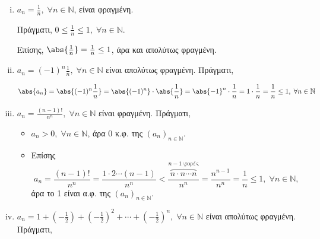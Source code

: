 \documentclass[main.tex]{subfiles}
\begin{document}
\begin{examples}
\item {}  
    \begin{enumerate}[i)]
        \item $ a_{n}= \frac{1}{n}, \; \forall n \in \mathbb{N} $, είναι 
            φραγμένη.

            Πράγματι, $ 0 \leq \frac{1}{n} \leq 1, \; \forall n \in 
            \mathbb{N} $. 

            Επίσης, $ \abs{\frac{1}{n}} = \frac{1}{n} \leq 1 $, άρα και 
            απολύτως φραγμένη.
        \item $ a_{n}=(-1)^{n} \frac{1}{n}, \; \forall n \in \mathbb{N} $ 
            είναι απολύτως φραγμένη. Πράγματι,

            \[
                \abs{a_{n}} = \abs{(-1)^{n} \frac{1}{n}} = \abs{(-1)^{n}} 
                \cdot \abs{\frac{1}{n}} = \abs{-1}^{n} \cdot \frac{1}{n}
                = 1 \cdot \frac{1}{n} = \frac{1}{n} \leq 1, \; \forall n 
                \in \mathbb{N}
            \] 

        \item $ a_{n}= \frac{(n-1)!}{n^{n}}, \; \forall n \in \mathbb{N} $
            είναι φραγμένη. Πράγματι, 
          
            \begin{itemize}
                \item $ a_{n} > 0, \; \forall n \in 
                    \mathbb{N}$, άρα 0 κ.φ. της $( a_{n})_{n \in 
                    \mathbb{N}} $. 
                \item Επίσης 
                    \[
                        a_{n}= \frac{(n-1)!}{n^{n}} = \frac{1 \cdot 2 
                            \cdots (n-1)}{n^{n}} < \frac{\overbrace{n 
                            \cdot n \cdots n} ^{n-1 \; 
                    \text{φορές}}}{n^{n}} = \frac{n^{n-1}}{n^{n}} =
                        \frac{1}{n} \leq 1, \; \forall n \in \mathbb{N},
                    \]
                    άρα το 1 είναι α.φ. της $(a_{n})_{n \in \mathbb{N}}$. 
            \end{itemize}

        \item $ a_{n}= 1 + \left(- \frac{1}{2} \right) + \left(- 
                \frac{1}{2}\right)^{2} + \cdots + \left(-\frac{1}{2} 
            \right) ^{n}, 
            \; \forall n \in \mathbb{N} $ είναι απολύτως φραγμένη. Πράγματι,


\end{enumerate}
\end{examples}
\end{document}
